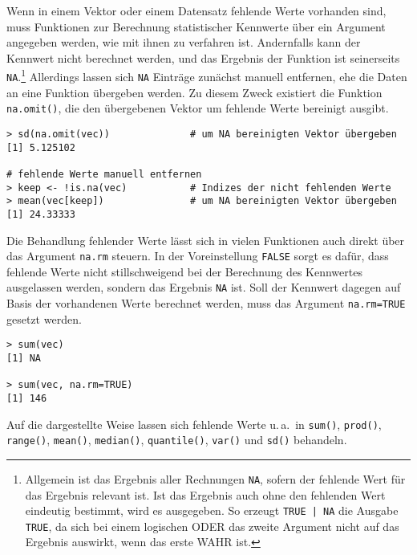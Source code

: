 Wenn in einem Vektor oder einem Datensatz fehlende Werte vorhanden sind, muss Funktionen zur Berechnung statistischer Kennwerte über ein Argument angegeben werden, wie mit ihnen zu verfahren ist. Andernfalls kann der Kennwert nicht berechnet werden, und das Ergebnis der Funktion ist seinerseits \lstinline!NA!\@.\footnote{\label{ftn:whenNA}Allgemein ist das Ergebnis aller Rechnungen \lstinline!NA!, sofern der fehlende Wert für das Ergebnis relevant ist. Ist das Ergebnis auch ohne den fehlenden Wert eindeutig bestimmt, wird es ausgegeben. So erzeugt \lstinline!TRUE | NA! die Ausgabe \lstinline!TRUE!, da sich bei einem logischen ODER das zweite Argument nicht auf das Ergebnis auswirkt, wenn das erste WAHR ist.} Allerdings lassen sich \lstinline!NA! Einträge zunächst manuell entfernen, ehe die Daten an eine Funktion übergeben werden. Zu diesem Zweck existiert die Funktion \lstinline!na.omit()!, die den übergebenen Vektor um fehlende Werte bereinigt ausgibt.
\begin{lstlisting}
> sd(na.omit(vec))              # um NA bereinigten Vektor übergeben
[1] 5.125102

# fehlende Werte manuell entfernen
> keep <- !is.na(vec)           # Indizes der nicht fehlenden Werte
> mean(vec[keep])               # um NA bereinigten Vektor übergeben
[1] 24.33333
\end{lstlisting}

Die Behandlung fehlender Werte lässt sich in vielen Funktionen auch direkt über das Argument \lstinline!na.rm! steuern. In der Voreinstellung \lstinline!FALSE! sorgt es dafür, dass fehlende Werte nicht stillschweigend bei der Berechnung des Kennwertes ausgelassen werden, sondern das Ergebnis \lstinline!NA! ist. Soll der Kennwert dagegen auf Basis der vorhandenen Werte berechnet werden, muss das Argument \lstinline!na.rm=TRUE! gesetzt werden.
\begin{lstlisting}
> sum(vec)
[1] NA

> sum(vec, na.rm=TRUE)
[1] 146
\end{lstlisting}

Auf die dargestellte Weise lassen sich fehlende Werte u.\,a.\ in \lstinline!sum()!, \lstinline!prod()!, \lstinline!range()!, \lstinline!mean()!, \lstinline!median()!, \lstinline!quantile()!, \lstinline!var()! und \lstinline!sd()! behandeln.

